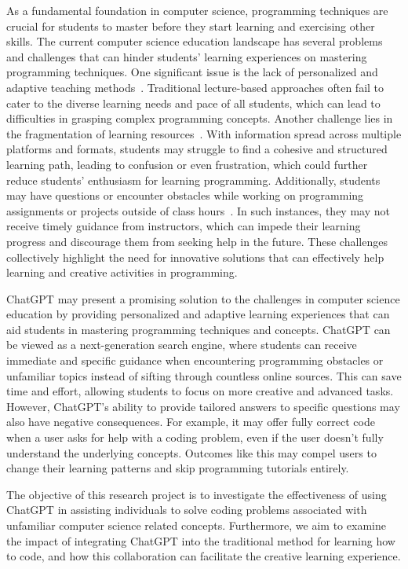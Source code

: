 \documentclass[manuscript,screen,nonacm]{acmart}
\begin{document}
As a fundamental foundation in computer science, programming techniques are crucial for students to master before they start learning and exercising other skills. The current computer science education landscape has several problems and challenges that can hinder students' learning experiences on mastering programming techniques. One significant issue is the lack of personalized and adaptive teaching methods~\cite{kopeyev2020using, cheah2020factors}. Traditional lecture-based approaches often fail to cater to the diverse learning needs and pace of all students, which can lead to difficulties in grasping complex programming concepts. Another challenge lies in the fragmentation of learning resources~\cite{cheah2020factors}. With information spread across multiple platforms and formats, students may struggle to find a cohesive and structured learning path, leading to confusion or even frustration, which could further reduce students' enthusiasm for learning programming. Additionally, students may have questions or encounter obstacles while working on programming assignments or projects outside of class hours~\cite{jeuring2022towards}. In such instances, they may not receive timely guidance from instructors, which can impede their learning progress and discourage them from seeking help in the future. These challenges collectively highlight the need for innovative solutions that can effectively help learning and creative activities in programming.

ChatGPT may present a promising solution to the challenges in computer science education by providing personalized and adaptive learning experiences that can aid students in mastering programming techniques and concepts. ChatGPT can be viewed as a next-generation search engine, where students can receive immediate and specific guidance when encountering programming obstacles or unfamiliar topics instead of sifting through countless online sources. This can save time and effort, allowing students to focus on more creative and advanced tasks. However, ChatGPT's ability to provide tailored answers to specific questions may also have negative consequences. For example, it may offer fully correct code when a user asks for help with a coding problem, even if the user doesn't fully understand the underlying concepts. Outcomes like this may compel users to change their learning patterns and skip programming tutorials entirely.

The objective of this research project is to investigate the effectiveness of using ChatGPT in assisting individuals to solve coding problems associated with unfamiliar computer science related concepts. Furthermore, we aim to examine the impact of integrating ChatGPT into the traditional method for learning how to code, and how this collaboration can facilitate the creative learning experience.
\end{document}
